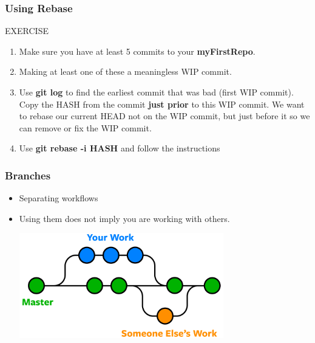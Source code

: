 \documentclass{beamer}
\begin{document}
\begin{frame}[fragile]
	\frametitle{Using Rebase}
	\begin{block}{EXERCISE}
		\begin{enumerate}
			\item Make sure you have at least 5 commits to your \textbf{myFirstRepo}.
			\item Making at least one of these a meaningless WIP commit. 
			\item Use \textbf{git log} to find the earliest commit that was bad (first WIP commit). Copy the HASH from the commit \textbf{just prior} to this WIP commit. We want to rebase our current HEAD not on the WIP commit, but just before it so we can remove or fix the WIP commit. 
			\item Use \textbf{git rebase -i \textlangle{}HASH\textrangle{}} and follow the instructions
		\end{enumerate}
	\end{block}
\end{frame}

\begin{frame}[fragile]
\frametitle{Branches}
\begin{itemize}
\item Separating workflows
\item Using them does not imply you are working with others. 
\begin{center}\includegraphics[width=0.7\textwidth]{branch.png}\end{center}
\end{itemize}
\end{frame}
\end{document}
